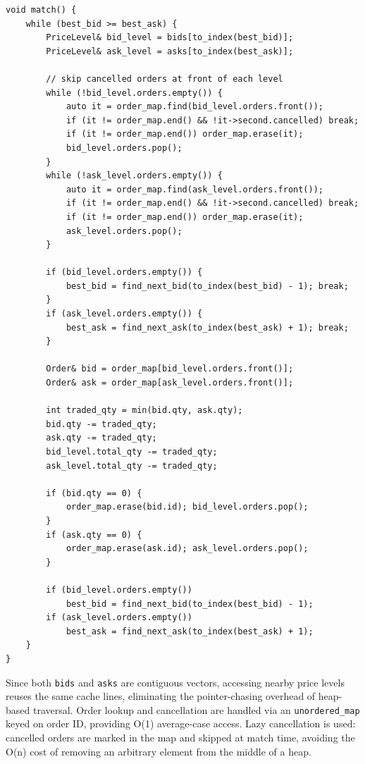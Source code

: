 \documentclass{article}
\begin{document}
\begin{lstlisting}[caption={Matching Logic}]
void match() {
    while (best_bid >= best_ask) {
        PriceLevel& bid_level = bids[to_index(best_bid)];
        PriceLevel& ask_level = asks[to_index(best_ask)];

        // skip cancelled orders at front of each level
        while (!bid_level.orders.empty()) {
            auto it = order_map.find(bid_level.orders.front());
            if (it != order_map.end() && !it->second.cancelled) break;
            if (it != order_map.end()) order_map.erase(it);
            bid_level.orders.pop();
        }
        while (!ask_level.orders.empty()) {
            auto it = order_map.find(ask_level.orders.front());
            if (it != order_map.end() && !it->second.cancelled) break;
            if (it != order_map.end()) order_map.erase(it);
            ask_level.orders.pop();
        }

        if (bid_level.orders.empty()) {
            best_bid = find_next_bid(to_index(best_bid) - 1); break;
        }
        if (ask_level.orders.empty()) {
            best_ask = find_next_ask(to_index(best_ask) + 1); break;
        }

        Order& bid = order_map[bid_level.orders.front()];
        Order& ask = order_map[ask_level.orders.front()];

        int traded_qty = min(bid.qty, ask.qty);
        bid.qty -= traded_qty;
        ask.qty -= traded_qty;
        bid_level.total_qty -= traded_qty;
        ask_level.total_qty -= traded_qty;

        if (bid.qty == 0) {
            order_map.erase(bid.id); bid_level.orders.pop();
        }
        if (ask.qty == 0) {
            order_map.erase(ask.id); ask_level.orders.pop();
        }

        if (bid_level.orders.empty())
            best_bid = find_next_bid(to_index(best_bid) - 1);
        if (ask_level.orders.empty())
            best_ask = find_next_ask(to_index(best_ask) + 1);
    }
}
\end{lstlisting}

Since both \texttt{bids} and \texttt{asks} are contiguous vectors, accessing nearby
price levels reuses the same cache lines, eliminating the pointer-chasing overhead of
heap-based traversal. Order lookup and cancellation are handled via an
\texttt{unordered\_map} keyed on order ID, providing O(1) average-case access. Lazy
cancellation is used: cancelled orders are marked in the map and skipped at match time,
avoiding the O(n) cost of removing an arbitrary element from the middle of a heap.
\end{document}
